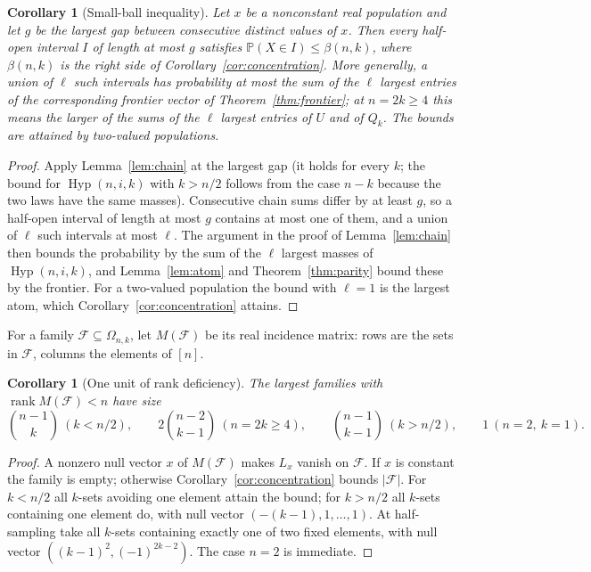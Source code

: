\documentclass[11pt]{article}
\newtheorem{corollary}[theorem]{Corollary}
\theoremstyle{remark}
\newcommand{\Prb}{\mathbb P}
\newcommand{\Hyp}{\operatorname{Hyp}}
\newcommand{\rank}{\operatorname{rank}}
\begin{document}
\begin{corollary}[Small-ball inequality]\label{cor:smallball}
Let \(x\) be a nonconstant real population and let \(g\) be the largest gap
between consecutive distinct values of \(x\). Then every half-open interval
\(I\) of length at most \(g\) satisfies \(\Prb(X\in I)\le\beta(n,k)\), where
\(\beta(n,k)\) is the right side of Corollary~\ref{cor:concentration}. More
generally, a union of \(\ell\) such intervals has probability at most the sum
of the \(\ell\) largest entries of the corresponding frontier vector of
Theorem~\ref{thm:frontier}; at \(n=2k\ge4\) this means the larger of the
sums of the \(\ell\) largest entries of \(U\) and of \(Q_k\). The bounds are
attained by two-valued populations.
\end{corollary}
\begin{proof}
Apply Lemma~\ref{lem:chain} at the largest gap (it holds for every
\(k\); the bound for \(\Hyp(n,i,k)\) with \(k>n/2\) follows from the case
\(n-k\) because the two laws have the same masses). Consecutive chain sums differ
by at least \(g\), so a half-open interval of length at most \(g\) contains at
most one of them, and a union of \(\ell\) such intervals at most \(\ell\). The
argument in the proof of Lemma~\ref{lem:chain} then bounds the probability by
the sum of the \(\ell\) largest masses of \(\Hyp(n,i,k)\), and
Lemma~\ref{lem:atom} and Theorem~\ref{thm:parity} bound these by the frontier.
For a two-valued population the bound with \(\ell=1\) is the largest atom,
which Corollary~\ref{cor:concentration} attains.
\end{proof}

For a family \(\mathcal F\subseteq\Omega_{n,k}\), let \(M(\mathcal F)\) be its
real incidence matrix: rows are the sets in \(\mathcal F\), columns the
elements of \([n]\).

\begin{corollary}[One unit of rank deficiency]\label{cor:rank}
The largest families with \(\rank M(\mathcal F)<n\) have size
\[
 \binom{n-1}{k}\ (k<n/2),\qquad
 2\binom{n-2}{k-1}\ (n=2k\ge4),\qquad
 \binom{n-1}{k-1}\ (k>n/2),\qquad
 1\ (n=2,\ k=1).
\]
\end{corollary}
\begin{proof}
A nonzero null vector \(x\) of \(M(\mathcal F)\) makes \(L_x\) vanish on
\(\mathcal F\). If \(x\) is constant the family is empty; otherwise
Corollary~\ref{cor:concentration} bounds \(|\mathcal F|\). For \(k<n/2\) all
\(k\)-sets avoiding one element attain the bound; for \(k>n/2\) all \(k\)-sets
containing one element do, with null vector \((-(k-1),1,\ldots,1)\). At
half-sampling take all \(k\)-sets containing exactly one of two fixed elements,
with null vector \(((k-1)^2,(-1)^{2k-2})\). The case \(n=2\) is immediate.
\end{proof}
\end{document}
